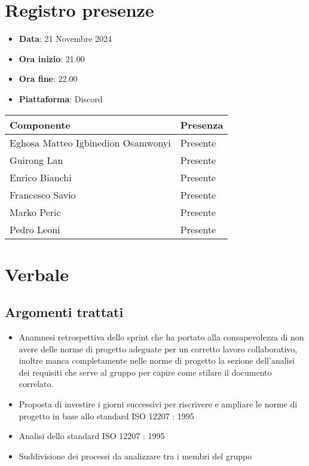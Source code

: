 \documentclass[a4paper, 12pt]{article}
\begin{document}
\section{Registro presenze}
\begin{itemize}
    \item[] \textbf{Data}: 21 Novembre 2024
    \item[] \textbf{Ora inizio}:  21.00
    \item[] \textbf{Ora fine}: 22.00
    \item[] \textbf{Piattaforma}: Discord	
\end{itemize}
\begin{table}[!h]
\centering
{\renewcommand{\arraystretch}{2}
\begin{tabularx}{\textwidth}{| X | X |}
    \hline
        \textbf{\large Componente} & 
        \textbf{\large Presenza} \\ 
    \hline 
    \hline
        Eghosa Matteo Igbinedion Osamwonyi&
        Presente \\
    \hline 
        Guirong Lan&
        Presente \\
    \hline 
        Enrico Bianchi&
        Presente \\
    \hline 
        Francesco Savio&
        Presente \\
    \hline 
        Marko Peric&
        Presente \\
    \hline 
        Pedro Leoni&
        Presente \\
    \hline 

\end{tabularx}}
\end{table}

\newpage

\section{Verbale}
\subsection{Argomenti trattati}
\begin{itemize}
    \item Anamnesi retrospettiva dello sprint che ha portato alla consapevolezza di non avere delle norme di progetto adeguate per un corretto lavoro collaborativo, inoltre manca completamente nelle norme di progetto la sezione dell'analisi dei requisiti che serve al gruppo per capire come stilare il documento correlato.
    \item Proposta di investire i giorni successivi per riscrivere e ampliare le norme di progetto in base allo standard ISO 12207 : 1995
    \item Analisi dello standard ISO 12207 : 1995
    \item Suddivisione dei processi da analizzare tra i membri del gruppo
\end{itemize}
\end{document}
